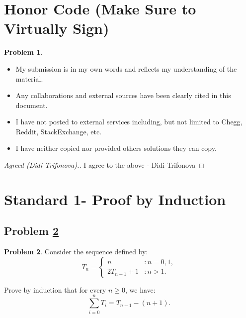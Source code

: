 \documentclass[11pt]{article}
\theoremstyle{definition}
\theoremstyle{definition}
\newtheorem{required}{Problem}
\theoremstyle{definition}
\begin{document}
\section{Honor Code (Make Sure to Virtually Sign)} \label{HonorCode}

\begin{required}
\begin{itemize}
\item My submission is in my own words and reflects my understanding of the material.
\item Any collaborations and external sources have been clearly cited in this document.
\item I have not posted to external services including, but not limited to Chegg, Reddit, StackExchange, etc.
\item I have neither copied nor provided others solutions they can copy.
\end{itemize}

\end{required}

\begin{proof}[Agreed (Didi Trifonova).]
I agree to the above - Didi Trifonova
\end{proof}


\newpage
\section{Standard 1- Proof by Induction}

\subsection{Problem \ref{Induction1}}
\begin{required} \label{Induction1}
Consider the sequence defined by:
\[
T_{n} = \begin{cases} n & : n = 0, 1, \\
2T_{n-1} + 1 & : n > 1.
\end{cases}
\]

\noindent Prove by induction that for every $n \geq 0$, we have:
\[
\sum_{i=0}^{n} T_{i} = T_{n+1} - (n+1).
\]
\end{required}

\end{document}
